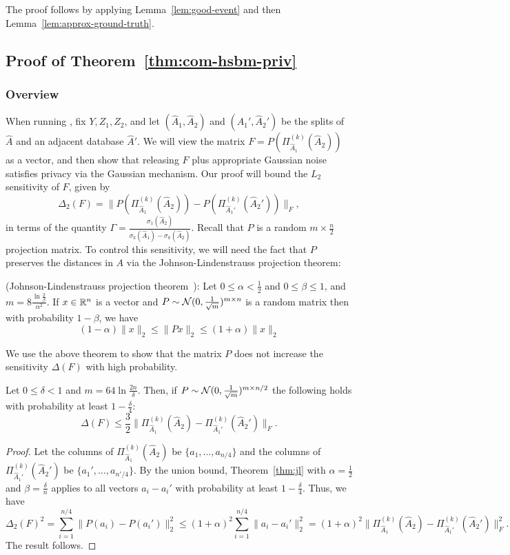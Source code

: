 The proof follows by applying Lemma~\ref{lem:good-event} and then Lemma~\ref{lem:approx-ground-truth}.

\subsection{Proof of Theorem~\ref{thm:com-hsbm-priv}}\label{sec:com-hsbm-priv}
\subsubsection{Overview}
When running \dpcom{}, fix $Y,Z_1,Z_2$, and let $(\hat{A}_1, \hat{A}_2)$ and $(\hat{A}_1', \hat{A}_2')$ be the splits of $\hat{A}$ and an adjacent database $\hat{A}'$.
We will view the matrix $F = P(\Pi_{\hat{A}_1}^{(k)}(\hat{A}_2))$ as a vector, and then show that releasing $F$ plus appropriate Gaussian noise satisfies privacy via the Gaussian mechanism. Our proof will bound the $L_2$ sensitivity of $F$, given by
\[
    \Delta_2(F) = \|P(\Pi_{\hat{A}_1}^{(k)}(\hat{A}_2)) - P(\Pi_{\hat{A}_1'}^{(k)}(\hat{A}_2'))\|_F,
\]
in terms of the quantity $\Gamma = \frac{\sigma_1(\hat{A}_2)}{\sigma_k(\hat{A}_1) - \sigma_k(\hat{A}_2)}$. Recall that $P$ is a random $m \times \frac{n}{2}$ projection matrix. To control this sensitivity, we will need the fact that $P$ preserves the distances in $A$ via the Johnson-Lindenstrauss projection theorem:
\begin{thm}\label{thm:jl}
(Johnson-Lindenstrauss projection theorem~\citep{johnson1984extensions}): Let $0 \leq \alpha < \frac{1}{2}$ and $0 \leq \beta \leq 1$, and $m = 8\frac{ \ln \frac{2}{\beta}}{\alpha^2}$. If $x \in \mathbb{R}^n$ is a vector and $P \sim \mathcal{N}(0, \frac{1}{\sqrt{m}})^{m \times n}$ is a random matrix then with probability $1-\beta$, we have
\[
(1-\alpha) \|x\|_2 \leq \|Px\|_2 \leq (1+\alpha) \|x\|_2
\]
\end{thm}
We use the above theorem to show that the matrix $P$ does not increase the sensitivity $\Delta(F)$ with high probability.
\begin{lem}\label{lem:proj-sens}
    Let $0 \leq \delta < 1$ and $m = 64 \ln \frac{2n}{\delta}$. Then, if $P \sim \mathcal{N}(0, \frac{1}{\sqrt{m}})^{m \times n/2}$ the following holds with probability at least $1-\frac \delta 4$:
    \[
        \Delta(F) \leq \frac 3 2 \|\Pi_{\hat{A}_1}^{(k)}(\hat{A}_2) - \Pi_{\hat{A}_1'}^{(k)}(\hat{A}_2')\|_F.
    \]
\end{lem}
\begin{proof}
Let the columns of $\Pi_{\hat{A}_1}^{(k)}(\hat{A}_2)$ be $\{a_1, \ldots, a_{n/4}\}$ and the columns of $\Pi_{\hat{A}_1'}^{(k)}(\hat{A}_2')$ be $\{a_1', \ldots, a_{n'/4}\}$. By the union bound, Theorem~\ref{thm:jl} with $\alpha=\frac{1}{2}$ and $\beta = \frac{\delta}{n}$ applies to all vectors $a_i - a_i'$ with probability at least $1-\frac{\delta}{4}$. Thus, we have
\[
\Delta_2(F)^2 = \sum_{i=1}^{n/4} \|P(a_i) - P(a_i')\|_2^2 \leq (1+\alpha)^2 \sum_{i=1}^{n/4} \|a_i - a_i'\|_2^2 = (1+\alpha)^2  \|\Pi_{\hat{A}_1}^{(k)}(\hat{A}_2) - \Pi_{\hat{A}_1'}^{(k)}(\hat{A}_2')\|_F^2.
\]
The result follows.
\end{proof}
